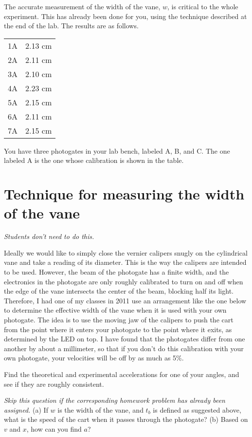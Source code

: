 The accurate measurement of the width of the vane, $w$, is critical
to the whole experiment. This has already been done for you, using the technique
described at the end of the lab. The results are as follows.

\noindent \begin{tabular}{ll}
1A & 2.13 cm \\
2A & 2.11 cm \\
3A & 2.10 cm \\
4A & 2.23 cm \\
5A & 2.15 cm \\
6A & 2.11 cm \\
7A & 2.15 cm
\end{tabular}

\noindent You have three photogates in your lab bench, labeled A, B, and C.
The one labeled A is the one whose calibration is shown in the table.

\section*{Technique for measuring the width of the vane}

\emph{Students don't need to do this.}

Ideally we would like to simply close the vernier calipers snugly on the
cylindrical vane and take a reading of its diameter. This is the way the
calipers are intended to be used. However, the beam of the photogate
has a finite width, and the electronics in the photogate are only roughly
calibrated to turn on and off when the edge of the vane intersects the
center of the beam, blocking half its light. Therefore, I had one of my classes in 2011 use
an arrangement like the one below to determine the effective width of the
vane when it is used with your own photogate. The idea is to use the moving jaw of the calipers
to push the cart from the point where it enters your photogate to the point
where it exits, as determined by the LED on top. I have found that the
photogates differ from one another by about a millimeter, so that if you
don't do this calibration with your own photogate, your velocities will be
off by as much as 5\%. 


\selfcheck

Find the theoretical and experimental accelerations for one
of your angles, and see if they are roughly consistent.

\prelab

\prelabquestion   \emph{Skip this question if the corresponding homework problem
has already been assigned.} (a) If $w$ is the width of the vane, and $t_b$ is defined
as suggested above, what is the speed of the cart when it
passes through the photogate? 
(b) Based on $v$ and $x$, how can you find $a$?

